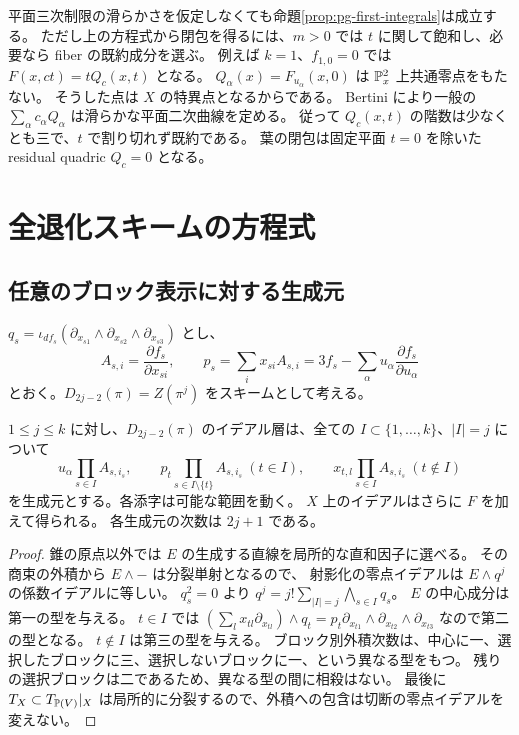 \begin{remark}\label{rem:pg-zero-restriction-leaf}
平面三次制限の滑らかさを仮定しなくても命題\ref{prop:pg-first-integrals}は成立する。
ただし上の方程式から閉包を得るには、$m>0$ では $t$ に関して飽和し、必要なら fiber の既約成分を選ぶ。
例えば $k=1$、$f_{1,0}=0$ では $F(x,ct)=tQ_c(x,t)$ となる。
$Q_\alpha(x)=F_{u_\alpha}(x,0)$ は $\mathbb P_x^2$ 上共通零点をもたない。
そうした点は $X$ の特異点となるからである。
Bertini により一般の $\sum_\alpha c_\alpha Q_\alpha$ は滑らかな平面二次曲線を定める。
従って $Q_c(x,t)$ の階数は少なくとも三で、$t$ で割り切れず既約である。
葉の閉包は固定平面 $t=0$ を除いた residual quadric $Q_c=0$ となる。
\end{remark}

\section{全退化スキームの方程式}\label{sec:pg-degeneracy}
\subsection{任意のブロック表示に対する生成元}
$q_s=\iota_{df_s}(\partial_{x_{s1}}\wedge\partial_{x_{s2}}\wedge\partial_{x_{s3}})$ とし、
\[
A_{s,i}=\frac{\partial f_s}{\partial x_{si}},\qquad
p_s=\sum_i x_{si}A_{s,i}=3f_s-\sum_\alpha u_\alpha\frac{\partial f_s}{\partial u_\alpha}
\]
とおく。$D_{2j-2}(\pi)=Z(\pi^j)$ をスキームとして考える。
\begin{proposition}\label{prop:pg-deg-ideal}
$1\leq j\leq k$ に対し、$D_{2j-2}(\pi)$ のイデアル層は、全ての
$I\subset\{1,\ldots,k\}$、$|I|=j$ について
\begin{equation}
 u_\alpha\prod_{s\in I}A_{s,i_s},\qquad
 p_t\prod_{s\in I\setminus\{t\}}A_{s,i_s}\ (t\in I),\qquad
 x_{t,l}\prod_{s\in I}A_{s,i_s}\ (t\notin I)\label{eq:pg-deg-generators}
\end{equation}
を生成元とする。各添字は可能な範囲を動く。
$X$ 上のイデアルはさらに $F$ を加えて得られる。
各生成元の次数は $2j+1$ である。
\end{proposition}
\begin{proof}
錐の原点以外では $E$ の生成する直線を局所的な直和因子に選べる。
その商束の外積から $E\wedge-$ は分裂単射となるので、
射影化の零点イデアルは $E\wedge q^j$ の係数イデアルに等しい。
$q_s^2=0$ より $q^j=j!\sum_{|I|=j}\bigwedge_{s\in I}q_s$。
$E$ の中心成分は第一の型を与える。
$t\in I$ では $(\sum_lx_{tl}\partial_{x_{tl}})\wedge q_t
=p_t\partial_{x_{t1}}\wedge\partial_{x_{t2}}\wedge\partial_{x_{t3}}$ なので第二の型となる。
$t\notin I$ は第三の型を与える。
ブロック別外積次数は、中心に一、選択したブロックに三、選択しないブロックに一、という異なる型をもつ。
残りの選択ブロックは二であるため、異なる型の間に相殺はない。
最後に $T_X\subset T_{\mathbb P(V)}|_X$ は局所的に分裂するので、外積への包含は切断の零点イデアルを変えない。
\end{proof}

